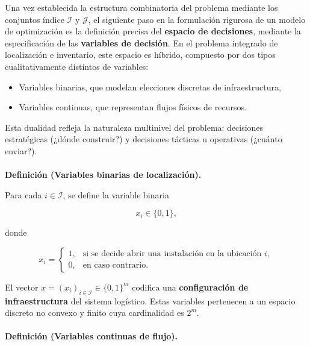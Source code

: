 \documentclass[
  spanish,
  letterpaper,
  DIV=11,
  numbers=noendperiod]{scrartcl}
\makeatletter
\let\oldparagraph\paragraph
\renewcommand{\paragraph}{
    \@ifstar
      \xxxParagraphStar
      \xxxParagraphNoStar
  }
\newcommand{\xxxParagraphStar}[1]{\oldparagraph*{#1}\mbox{}}
\newcommand{\xxxParagraphNoStar}[1]{\oldparagraph{#1}\mbox{}}
\providecommand{\tightlist}{%
  \setlength{\itemsep}{0pt}\setlength{\parskip}{0pt}}
\makeatother
\begin{document}
Una vez establecida la estructura combinatoria del problema mediante los
conjuntos índice \(\mathcal{I}\) y \(\mathcal{J}\), el siguiente paso en
la formulación rigurosa de un modelo de optimización es la definición
precisa del \textbf{espacio de decisiones}, mediante la especificación
de las \textbf{variables de decisión}. En el problema integrado de
localización e inventario, este espacio es híbrido, compuesto por dos
tipos cualitativamente distintos de variables:

\begin{itemize}
\tightlist
\item
  Variables binarias, que modelan elecciones discretas de
  infraestructura,
\item
  Variables continuas, que representan flujos físicos de recursos.
\end{itemize}

Esta dualidad refleja la naturaleza multinivel del problema: decisiones
estratégicas (¿dónde construir?) y decisiones tácticas u operativas
(¿cuánto enviar?).

\paragraph{\texorpdfstring{\textbf{Definición (Variables binarias de
localización).}}{Definición (Variables binarias de localización).}}\label{definiciuxf3n-variables-binarias-de-localizaciuxf3n.}

Para cada \(i \in \mathcal{I}\), se define la variable binaria

\[
x_i \in \{0,1\},
\]

donde

\[
x_i =
\begin{cases}
1, & \text{si se decide abrir una instalación en la ubicación } i, \\
0, & \text{en caso contrario}.
\end{cases}
\]

El vector \(x = (x_i)_{i \in \mathcal{I}} \in \{0,1\}^m\) codifica una
\textbf{configuración de infraestructura} del sistema logístico. Estas
variables pertenecen a un espacio discreto no convexo y finito cuya
cardinalidad es \(2^m\).

\paragraph{\texorpdfstring{\textbf{Definición (Variables continuas de
flujo).}}{Definición (Variables continuas de flujo).}}\label{definiciuxf3n-variables-continuas-de-flujo.}
\end{document}
